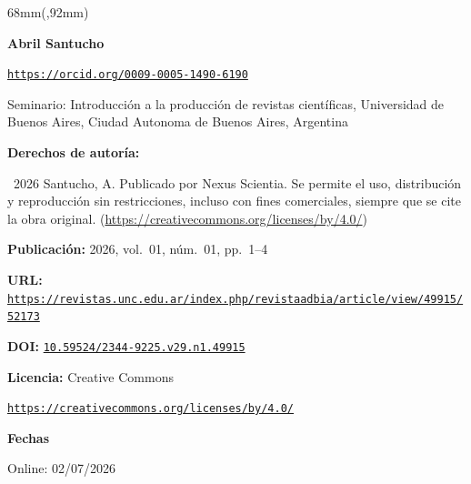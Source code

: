 \begin{textblock*}{68mm}(\gbbloquex,92mm)
{\setlength{\leftskip}{0pt}\setlength{\parindent}{0pt}%
\noindent\begin{minipage}[t]{68mm}
\sffamily\small\setlength{\parskip}{1pt}
{\bfseries\color{azulrevista}Abril Santucho}\par
{\scriptsize\texttt{\href{https://orcid.org/0009-0005-1490-6190}{https://orcid.org/0009-0005-1490-6190}}}\par
Seminario: Introducción a la producción de revistas científicas, Universidad de Buenos Aires, Ciudad Autonoma de Buenos Aires, Argentina\par
\vspace{6pt}
{\bfseries\color{azulrevista!70}Derechos de autor\'ia:}\par
\textcopyright\ 2026 Santucho, A. Publicado por Nexus Scientia. Se permite el uso, distribución y reproducción sin restricciones, incluso con fines comerciales, siempre que se cite la obra original. (\href{https://creativecommons.org/licenses/by/4.0/}{https://creativecommons.org/licenses/by/4.0/})\par\vspace{6pt}
{\bfseries\color{azulrevista!70}Publicación:} 2026, vol.~01, n\'um.~01, pp.~1--4\par\vspace{6pt}
{\bfseries\color{azulrevista!70}URL:} {\scriptsize\texttt{\href{https://revistas.unc.edu.ar/index.php/revistaadbia/article/view/49915/52173}{https://revistas.unc.edu.ar/index.php/revistaadbia/article/view/49915/52173}}}\par\vspace{6pt}
{\bfseries\color{azulrevista!70}DOI:} {\scriptsize\texttt{\href{https://doi.org/10.59524/2344-9225.v29.n1.49915}{10.59524/2344-9225.v29.n1.49915}}}\par\vspace{6pt}
{\bfseries\color{azulrevista!70}Licencia:} Creative Commons\par
{\scriptsize\texttt{\href{https://creativecommons.org/licenses/by/4.0/}{https://creativecommons.org/licenses/by/4.0/}}}\par
\vspace{6pt}
{\bfseries\color{azulrevista!70}Fechas}\par\vspace{2pt}
Online: 02/07/2026\par
\vspace{6pt}
\vspace{6pt}

\end{minipage}}
\end{textblock*}
